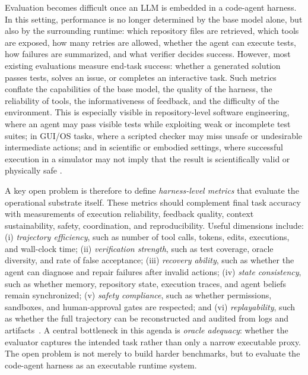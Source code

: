 Evaluation becomes difficult once an LLM is embedded in a code-agent harness. In this setting, performance is no longer determined by the base model alone, but also by the surrounding runtime: which repository files are retrieved, which tools are exposed, how many retries are allowed, whether the agent can execute tests, how failures are summarized, and what verifier decides success. However, most existing evaluations measure end-task success: whether a generated solution passes tests, solves an issue, or completes an interactive task. Such metrics conflate the capabilities of the base model, the quality of the harness, the reliability of tools, the informativeness of feedback, and the difficulty of the environment. This is especially visible in repository-level software engineering, where an agent may pass visible tests while exploiting weak or incomplete test suites; in GUI/OS tasks, where a scripted checker may miss unsafe or undesirable intermediate actions; and in scientific or embodied settings, where successful execution in a simulator may not imply that the result is scientifically valid or physically safe \citep{jimenez2024swebench,deng2025swe,miserendino2025swe,merrill2026terminal,jain2024livecodebench,chen2025scienceagentbenchrigorousassessmentlanguage}.

A key open problem is therefore to define \emph{harness-level metrics} that evaluate the operational substrate itself. These metrics should complement final task accuracy with measurements of execution reliability, feedback quality, context sustainability, safety, coordination, and reproducibility. Useful dimensions include: (i) \emph{trajectory efficiency}, such as number of tool calls, tokens, edits, executions, and wall-clock time; (ii) \emph{verification strength}, such as test coverage, oracle diversity, and rate of false acceptance; (iii) \emph{recovery ability}, such as whether the agent can diagnose and repair failures after invalid actions; (iv) \emph{state consistency}, such as whether memory, repository state, execution traces, and agent beliefs remain synchronized; (v) \emph{safety compliance}, such as whether permissions, sandboxes, and human-approval gates are respected; and (vi) \emph{replayability}, such as whether the full trajectory can be reconstructed and audited from logs and artifacts~\citep{anthropic2026agentevals}. A central bottleneck in this agenda is \emph{oracle adequacy}: whether the evaluator captures the intended task rather than only a narrow executable proxy. The open problem is not merely to build harder benchmarks, but to evaluate the code-agent harness as an executable runtime system.




